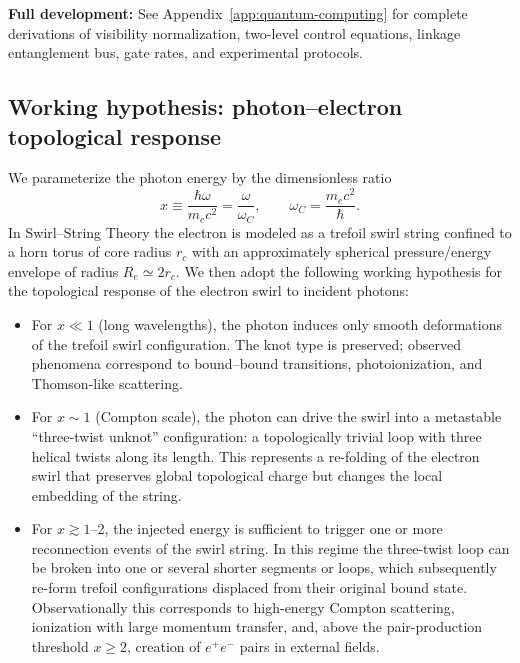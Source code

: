 \documentclass[10pt,reprint,aps,onecolumn,nofootinbib]{revtex4-2}
\begin{document}
            \textbf{Full development:} See Appendix~\ref{app:quantum-computing} for complete derivations of visibility normalization, two-level control equations, linkage entanglement bus, gate rates, and experimental protocols.


\subsection{Working hypothesis: photon--electron topological response}

    We parameterize the photon energy by the dimensionless ratio
    \begin{equation}
        x \equiv \frac{\hbar\omega}{m_e c^2}
        = \frac{\omega}{\omega_C},
        \qquad
        \omega_C = \frac{m_e c^2}{\hbar}.
    \end{equation}
    In Swirl--String Theory the electron is modeled as a trefoil swirl string
    confined to a horn torus of core radius $r_c$ with an approximately
    spherical pressure/energy envelope of radius $R_e\simeq 2 r_c$.  We then
    adopt the following working hypothesis for the topological response of
    the electron swirl to incident photons:

    \begin{itemize}
        \item For $x \ll 1$ (long wavelengths), the photon induces only
        smooth deformations of the trefoil swirl configuration.  The
        knot type is preserved; observed phenomena correspond to
        bound--bound transitions, photoionization, and Thomson-like
        scattering.
        \item For $x \sim 1$ (Compton scale), the photon can drive the swirl
        into a metastable ``three-twist unknot'' configuration: a
        topologically trivial loop with three helical twists along its
        length.  This represents a re-folding of the electron swirl
        that preserves global topological charge but changes the local
        embedding of the string.
        \item For $x \gtrsim 1$--2, the injected energy is sufficient to
        trigger one or more reconnection events of the swirl string.
        In this regime the three-twist loop can be broken into one or
        several shorter segments or loops, which subsequently re-form
        trefoil configurations displaced from their original bound
        state.  Observationally this corresponds to high-energy
        Compton scattering, ionization with large momentum transfer,
        and, above the pair-production threshold $x\ge 2$, creation of
        $e^+e^-$ pairs in external fields.
    \end{itemize}
\end{document}
